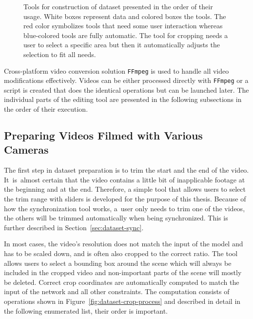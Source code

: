 \begin{figure}[ht!]
    
    \caption{Tools for construction of dataset presented in the order of their usage. White boxes represent data and colored boxes the tools. The red color symbolizes tools that need some user interaction whereas blue-colored tools are fully automatic. The tool for cropping needs a user to select a specific area but then it automatically adjusts the selection to fit all needs.}
    \label{fig:dataset-preparation}
\end{figure}

Cross-platform video conversion solution \texttt{FFmpeg} is used to handle all video modifications effectively. Videos can be either processed directly with \texttt{FFmpeg} or a script is created that does the identical operations but can be launched later. The individual parts of the editing tool are presented in the following subsections in the order of their execution.

\subsection{Preparing Videos Filmed with Various Cameras}

The first step in dataset preparation is to trim the start and the end of the video. It~is~almost certain that the video contains a little bit of inapplicable footage at the beginning and at the end. Therefore, a simple tool that allows users to select the trim range with sliders is developed for the purpose of this thesis. Because of how the synchronization tool works, a~user only needs to trim one of the videos, the others will be trimmed automatically when being synchronized. This is further described in Section~\ref{sec:dataset-sync}.

In most cases, the video's resolution does not match the input of the model and has to be scaled down, and is often also cropped to the correct ratio. The tool allows users to select a bounding box around the scene which will always be included in the cropped video and non-important parts of the scene will mostly be deleted. Correct crop coordinates are automatically computed to match the input of the network and all other constraints. The computation consists of operations shown in Figure~\ref{fig:dataset-crop-process} and described in detail in the following enumerated list, their order is important.


